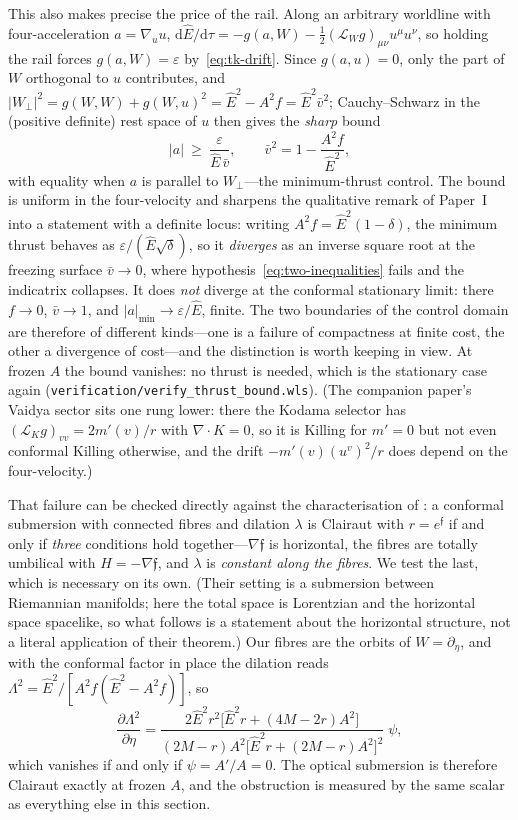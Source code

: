 \documentclass[12pt]{iopart}
\theoremstyle{plain}
\theoremstyle{definition}
\theoremstyle{remark}
\newcommand{\Ehat}{\hat E}
\newcommand{\dd}{\mathrm{d}}
\begin{document}
This also makes precise the price of the rail. Along an arbitrary worldline with
four-acceleration $a=\nabla_uu$,
$\dd\Ehat/\dd\tau=-g(a,W)-\tfrac12(\mathcal L_Wg)_{\mu\nu}u^\mu u^\nu$, so
holding the rail forces $g(a,W)=\varepsilon$ by~\eqref{eq:tk-drift}. Since
$g(a,u)=0$, only the part of $W$ orthogonal to $u$ contributes, and
$|W_\perp|^2=g(W,W)+g(W,u)^2=\Ehat^2-A^2f=\Ehat^2\bar v^2$; Cauchy--Schwarz in
the (positive definite) rest space of $u$ then gives the \emph{sharp} bound
\begin{equation}
    |a|\ \ge\ \frac{\varepsilon}{\Ehat\,\bar v},
    \qquad \bar v^2=1-\frac{A^2f}{\Ehat^2},
    \label{eq:thrust-bound}
\end{equation}
with equality when $a$ is parallel to $W_\perp$---the minimum-thrust control.
The bound is uniform in the four-velocity and sharpens the qualitative remark of
Paper~I into a statement with a definite locus: writing $A^2f=\Ehat^2(1-\delta)$,
the minimum thrust behaves as $\varepsilon/(\Ehat\sqrt\delta)$, so it
\emph{diverges} as an inverse square root at the freezing surface $\bar v\to0$,
where hypothesis~\eqref{eq:two-inequalities} fails and the indicatrix collapses.
It does \emph{not} diverge at the conformal stationary limit: there $f\to0$,
$\bar v\to1$, and $|a|_{\min}\to\varepsilon/\Ehat$, finite. The two boundaries of
the control domain are therefore of different kinds---one is a failure of
compactness at finite cost, the other a divergence of cost---and the distinction
is worth keeping in view. At frozen $A$ the bound vanishes: no thrust is needed,
which is the stationary case again
(\texttt{verification/verify\_thrust\_bound.wls}). (The companion paper's Vaidya
sector sits one rung lower: there the Kodama selector has
$(\mathcal L_Kg)_{vv}=2m'(v)/r$ with $\nabla\!\cdot\!K=0$, so it is Killing for
$m'=0$ but not even conformal Killing otherwise, and the drift
$-m'(v)(u^v)^2/r$ does depend on the four-velocity.)

That failure can be checked directly against the characterisation of
\cite{MeenaZawadzki2024}: a conformal submersion with connected fibres and
dilation $\lambda$ is Clairaut with $r=e^{\mathfrak f}$ if and only if
\emph{three} conditions hold together---$\nabla\mathfrak f$ is horizontal, the
fibres are totally umbilical with $H=-\nabla\mathfrak f$, and $\lambda$ is
\emph{constant along the fibres}. We test the last, which is necessary on its
own. (Their setting is a submersion between Riemannian manifolds; here the total
space is Lorentzian and the horizontal space spacelike, so what follows is a
statement about the horizontal structure, not a literal application of their
theorem.) Our fibres are the orbits of
$W=\partial_\eta$, and with the conformal factor in place the dilation reads
$\Lambda^2=\Ehat^2/[A^2f(\Ehat^2-A^2f)]$, so
\begin{equation}
    \frac{\partial\Lambda^2}{\partial\eta}
      =\frac{2\Ehat^2r^2\big[\Ehat^2r+(4M-2r)A^2\big]}
             {(2M-r)A^2\big[\Ehat^2r+(2M-r)A^2\big]^2}\;\psi ,
    \label{eq:dilation-fibre}
\end{equation}
which vanishes if and only if $\psi=A'/A=0$. The optical submersion is therefore
Clairaut exactly at frozen $A$, and the obstruction is measured by the same
scalar as everything else in this section.
\end{document}

